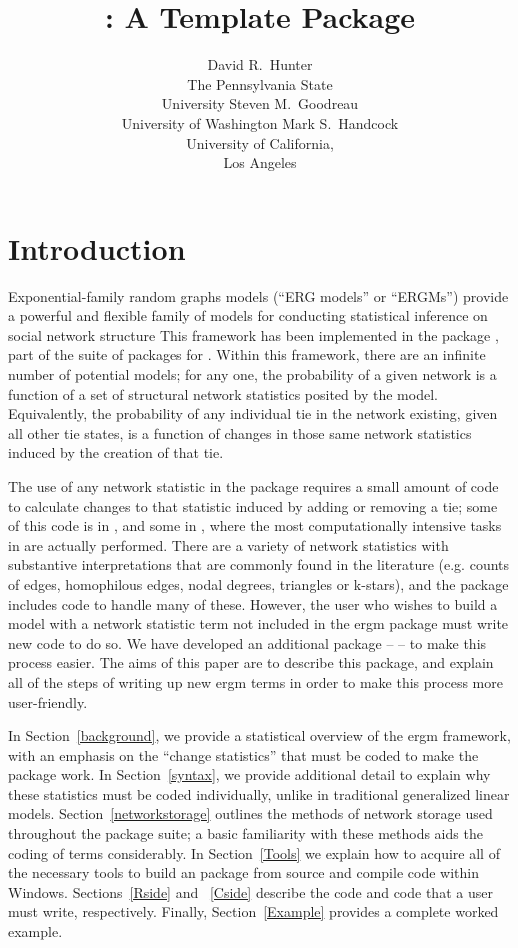 \documentclass[nojss]{jss}
\title{\pkg{ergm.userterms}: A Template Package}
\author{
  David R.\ Hunter \\ The Pennsylvania State\\University \And
  Steven M.\ Goodreau \\ University of Washington \And
  Mark S.\ Handcock \\ University of California,\\Los Angeles
}
\begin{document}
\section{Introduction}
\label{introduction}

Exponential-family random graphs models (``ERG models'' or ``ERGMs'') provide a powerful and flexible family of models for conducting statistical inference on social network structure
\citep{robins2007ier}  This framework has been implemented in the  package
\citep{ergmjss}, part of the  suite of packages \citep{statnetjss}
for  \citep{r2010}. Within this framework, there are an infinite number of potential models; for any one, the probability of a given network is a function of a set of structural network statistics posited by the model. Equivalently, the probability of any individual tie in the network existing, given all other tie states, is a function of changes in those same network statistics induced by the creation of that tie.

The use of any network statistic in the  package requires a small amount of code to calculate changes to that statistic induced by adding or removing a tie; some of this code is in , and some in , where the most computationally intensive tasks in  are actually performed. There are a variety of network statistics with substantive interpretations that are commonly found in the literature (e.g. counts of edges, homophilous edges, nodal degrees, triangles or k-stars), and the  package includes code to handle many of these.  However, the user who wishes to build a model with a network statistic term not included in the ergm package must write new code to do so.  We have developed an additional package --  -- to make this process easier.  The aims of this paper are to describe this package, and explain all of the steps of writing up new ergm terms in order to make this process more user-friendly.

In Section~\ref{background}, we provide a statistical overview of the ergm framework, with an emphasis on the ``change statistics'' that must be coded to make the  package work.  In Section~\ref{syntax}, we provide additional detail to explain why these statistics must be coded individually, unlike in traditional generalized linear models. Section~\ref{networkstorage} outlines the methods of network storage used throughout the  package suite; a basic familiarity with these methods aids the coding of  terms considerably. In Section~\ref{Tools} we explain how to acquire all of the necessary tools to build an  package from source and compile  code within Windows. Sections~\ref{Rside} and ~\ref{Cside} describe the  code and  code that a user must write, respectively. Finally, Section~\ref{Example} provides a complete worked example.
\end{document}
